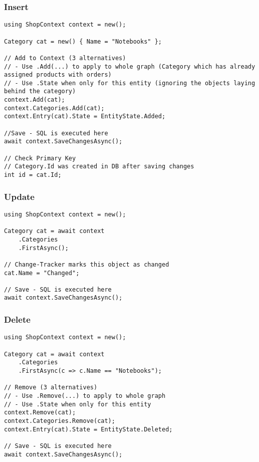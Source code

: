 \begin{multicols*}{2}
\subsubsection{Insert}
\begin{lstlisting}
using ShopContext context = new();

Category cat = new() { Name = "Notebooks" };

// Add to Context (3 alternatives)
// - Use .Add(...) to apply to whole graph (Category which has already assigned products with orders) 
// - Use .State when only for this entity (ignoring the objects laying behind the category)
context.Add(cat); 
context.Categories.Add(cat); 
context.Entry(cat).State = EntityState.Added;

//Save - SQL is executed here
await context.SaveChangesAsync();

// Check Primary Key
// Category.Id was created in DB after saving changes
int id = cat.Id; 
\end{lstlisting}
\subsubsection{Update}
\begin{lstlisting}
using ShopContext context = new();

Category cat = await context
    .Categories
    .FirstAsync();

// Change-Tracker marks this object as changed
cat.Name = "Changed";

// Save - SQL is executed here
await context.SaveChangesAsync();
\end{lstlisting}
\subsubsection{Delete}
\begin{lstlisting}
using ShopContext context = new();

Category cat = await context
    .Categories
    .FirstAsync(c => c.Name == "Notebooks");

// Remove (3 alternatives)
// - Use .Remove(...) to apply to whole graph 
// - Use .State when only for this entity 
context.Remove(cat); 
context.Categories.Remove(cat); 
context.Entry(cat).State = EntityState.Deleted;

// Save - SQL is executed here
await context.SaveChangesAsync();
\end{lstlisting}


\end{multicols*}
